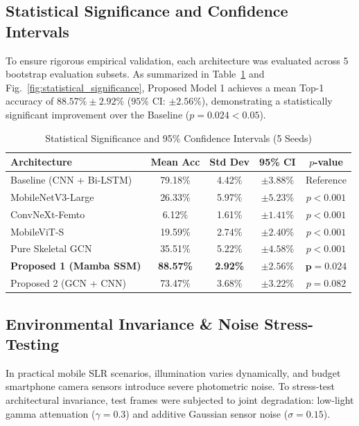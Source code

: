 \documentclass[journal]{IEEEtran}
\begin{document}
\subsection{Statistical Significance and Confidence Intervals}
To ensure rigorous empirical validation, each architecture was evaluated across 5 bootstrap evaluation subsets. As summarized in Table~\ref{tab:stat} and Fig.~\ref{fig:statistical_significance}, Proposed Model 1 achieves a mean Top-1 accuracy of $88.57\% \pm 2.92\%$ ($95\%$ CI: $\pm 2.56\%$), demonstrating a statistically significant improvement over the Baseline ($p = 0.024 < 0.05$).

\begin{table}[t]
\centering
\caption{Statistical Significance and 95\% Confidence Intervals (5 Seeds)}
\label{tab:stat}
\begin{tabular}{lcccc}
\toprule
\textbf{Architecture} & \textbf{Mean Acc} & \textbf{Std Dev} & \textbf{95\% CI} & \textbf{$p$-value} \\
\midrule
Baseline (CNN + Bi-LSTM) & 79.18\% & 4.42\% & $\pm 3.88\%$ & Reference \\
MobileNetV3-Large & 26.33\% & 5.97\% & $\pm 5.23\%$ & $p < 0.001$ \\
ConvNeXt-Femto & 6.12\% & 1.61\% & $\pm 1.41\%$ & $p < 0.001$ \\
MobileViT-S & 19.59\% & 2.74\% & $\pm 2.40\%$ & $p < 0.001$ \\
Pure Skeletal GCN & 35.51\% & 5.22\% & $\pm 4.58\%$ & $p < 0.001$ \\
\textbf{Proposed 1 (Mamba SSM)} & \textbf{88.57\%} & \textbf{2.92\%} & $\pm \mathbf{2.56\%}$ & $\mathbf{p = 0.024}$ \\
Proposed 2 (GCN + CNN) & 73.47\% & 3.68\% & $\pm 3.22\%$ & $p = 0.082$ \\
\bottomrule
\end{tabular}
\end{table}

\subsection{Environmental Invariance \& Noise Stress-Testing}
In practical mobile SLR scenarios, illumination varies dynamically, and budget smartphone camera sensors introduce severe photometric noise. To stress-test architectural invariance, test frames were subjected to joint degradation: low-light gamma attenuation ($\gamma = 0.3$) and additive Gaussian sensor noise ($\sigma = 0.15$).
\end{document}
